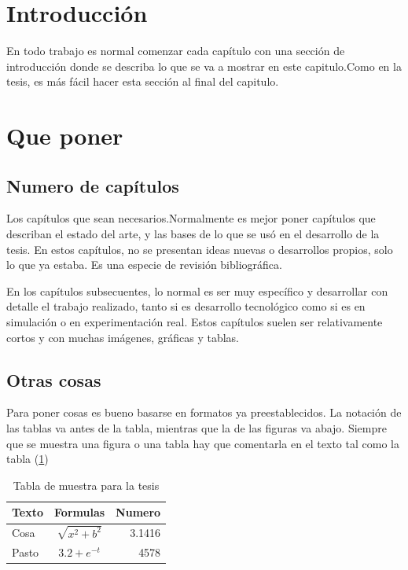 \section{Introducción}

 En todo trabajo es normal comenzar cada capítulo con una sección de
 introducción donde se describa lo que se va a mostrar en este
 capitulo.Como en la tesis, es más fácil hacer esta sección al final
 del capitulo.

 \section{Que poner}

 \subsection{Numero de capítulos}

 Los capítulos que sean necesarios.Normalmente es mejor poner
 capítulos que describan el estado del arte, y las bases de lo que
 se usó en el desarrollo de la tesis. En estos capítulos, no se
 presentan ideas nuevas o desarrollos propios, solo lo que ya
 estaba. Es una especie de revisión bibliográfica.

 En los capítulos subsecuentes, lo normal es ser muy específico y
 desarrollar con detalle el trabajo realizado, tanto si es
 desarrollo tecnológico como si es en simulación o en experimentación
 real. Estos capítulos suelen ser relativamente cortos y con muchas
 imágenes, gráficas y tablas.

 \subsection{Otras cosas}

 Para poner cosas es bueno basarse en formatos ya preestablecidos.
 La notación de las tablas va antes de la tabla, mientras que la de
 las figuras va abajo. Siempre que se muestra una figura o una tabla
 hay que comentarla en el texto tal como la tabla (\ref{Ta:primer ejemplo2})



\begin{table}
  \centering
  \caption{Tabla de muestra para la tesis}
  \label{Ta:primer ejemplo2}
  \begin{tabular}{|l|c|r|}
    \hline
    Texto & Formulas & Numero \\
    \hline\hline
    Cosa & $\sqrt{x^2 + b^2}$ & 3.1416 \\
    Pasto & $3.2 + e^{-t}$ & 4578 \\
    \hline
  \end{tabular}
\end{table}


